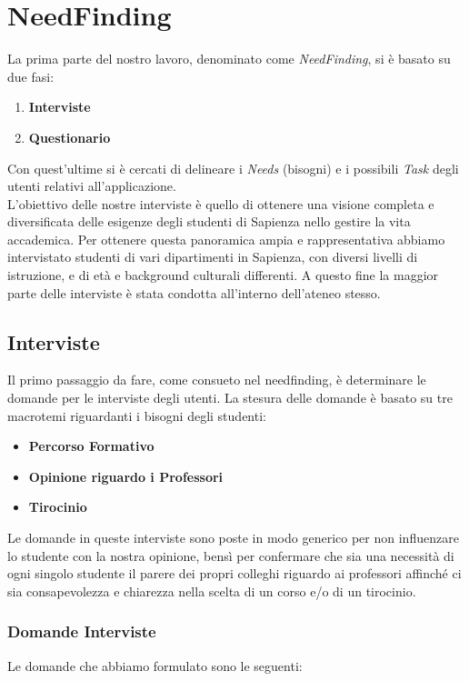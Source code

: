 \chapter{NeedFinding}

La prima parte del nostro lavoro, denominato come \textit{NeedFinding},
si è basato su due fasi:
\begin{enumerate}
    \item \textbf{Interviste}
    \item \textbf{Questionario}
\end{enumerate}
Con quest'ultime si è cercati di delineare i \textit{Needs} (bisogni)
e i possibili \textit{Task} degli utenti relativi all'applicazione.\\

L'obiettivo delle nostre interviste è quello di ottenere una visione completa e diversificata delle esigenze degli studenti di Sapienza nello gestire la vita accademica.
Per ottenere questa panoramica ampia e rappresentativa abbiamo intervistato studenti di vari dipartimenti in Sapienza, con diversi livelli di istruzione, e di età e background culturali differenti.
A questo fine la maggior parte delle interviste è stata condotta all'interno dell'ateneo stesso.

\section{Interviste}
Il primo passaggio da fare, come consueto nel needfinding, è 
determinare le domande per le interviste degli utenti. 
La stesura delle domande è basato su tre macrotemi riguardanti 
i bisogni degli studenti:
\begin{itemize}
    \item \textbf{Percorso Formativo}
    \item \textbf{Opinione riguardo i Professori}
    \item \textbf{Tirocinio}
\end{itemize}
Le domande in queste interviste sono poste in modo generico
per non influenzare lo studente con la nostra opinione, bensì per confermare 
che sia una necessità di ogni singolo studente il parere dei 
propri colleghi riguardo ai professori affinché ci sia consapevolezza e chiarezza
nella scelta di un corso e/o di un tirocinio.


\subsection{Domande Interviste}
Le domande che abbiamo formulato sono le seguenti:
